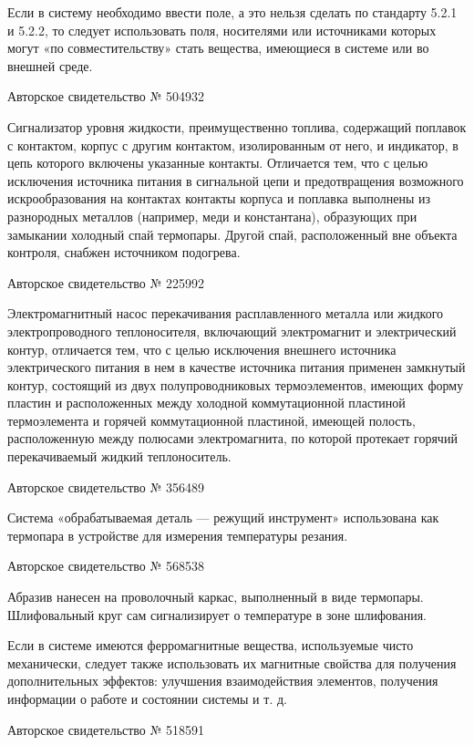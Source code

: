Если  в  систему необходимо  ввести  поле,  а  это нельзя  сделать  по
стандарту  5.2.1 и  5.2.2,  то следует  использовать поля,  носителями
или источниками  которых могут  «по совместительству»  стать вещества,
имеющиеся в системе или во внешней среде.


Авторское свидетельство № 504932

Сигнализатор  уровня  жидкости,  преимущественно  топлива,  содержащий
поплавок  с контактом,  корпус  с другим  контактом, изолированным  от
него,  и  индикатор,  в  цепь которого  включены  указанные  контакты.
Отличается тем, что с целью  исключения источника питания в сигнальной
цепи  и   предотвращения  возможного  искрообразования   на  контактах
контакты  корпуса   и  поплавка  выполнены  из   разнородных  металлов
(например, меди и константана), образующих при замыкании холодный спай
термопары. Другой  спай, расположенный  вне объекта  контроля, снабжен
источником подогрева.


Авторское свидетельство № 225992

Электромагнитный  насос   перекачивания  расплавленного   металла  или
жидкого  электропроводного   теплоносителя,  включающий  электромагнит
и  электрический  контур,  отличается  тем,  что  с  целью  исключения
внешнего источника  электрического питания в нем  в качестве источника
питания применен замкнутый контур, состоящий из двух полупроводниковых
термоэлементов, имеющих  форму пластин и расположенных  между холодной
коммутационной  пластиной   термоэлемента  и   горячей  коммутационной
пластиной,    имеющей    полость,   расположенную    между    полюсами
электромагнита,  по которой  протекает  горячий перекачиваемый  жидкий
теплоноситель.

Авторское свидетельство № 356489

Система «обрабатываемая деталь —  режущий инструмент» использована как
термопара в устройстве для измерения температуры резания.


Авторское свидетельство № 568538

Абразив нанесен  на проволочный каркас, выполненный  в виде термопары.
Шлифовальный круг сам сигнализирует о температуре в зоне шлифования.

Если  в системе  имеются ферромагнитные  вещества, используемые  чисто
механически,  следует также  использовать  их  магнитные свойства  для
получения дополнительных эффектов: улучшения взаимодействия элементов,
получения информации о работе и состоянии системы и т. д.


Авторское свидетельство № 518591

